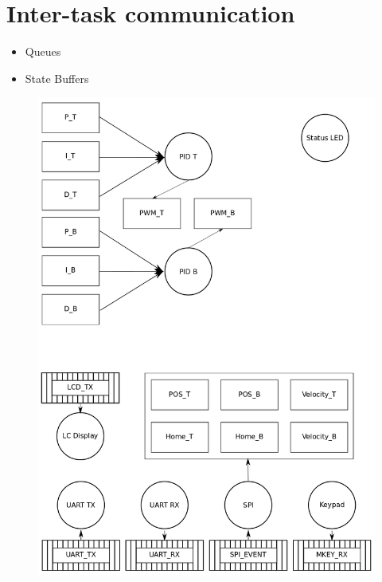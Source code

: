 \documentclass[../../../main]{subfiles}
\begin{document}
\section*{Inter-task communication}

\begin{itemize}
    \item Queues
    \item State Buffers
\end{itemize}









\begin{figure}[H]
\includegraphics[width=\columnwidth]{taskdiagram_full.png}
\end{figure}
\end{document}
